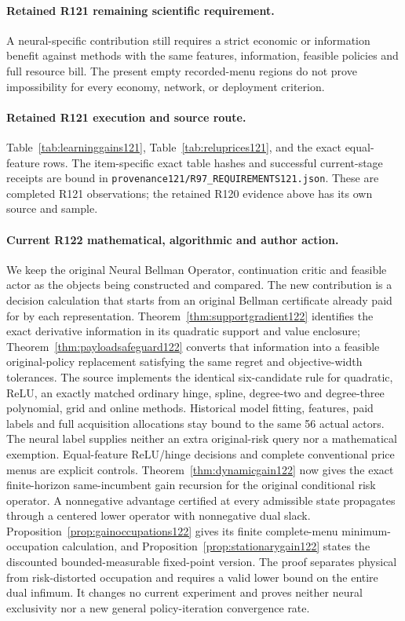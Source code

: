 \paragraph{Retained R121 remaining scientific requirement.}
A neural-specific contribution still requires a strict economic or information benefit against methods with the same features, information, feasible policies and full resource bill. The present empty recorded-menu regions do not prove impossibility for every economy, network, or deployment criterion.

\paragraph{Retained R121 execution and source route.}
Table~\ref{tab:learninggains121}, Table~\ref{tab:reluprices121}, and the exact equal-feature rows.
The item-specific exact table hashes and successful current-stage receipts are bound in \nolinkurl{provenance121/R97_REQUIREMENTS121.json}. These are completed R121 observations; the retained R120 evidence above has its own source and sample.
\paragraph{Current R122 mathematical, algorithmic and author action.}
We keep the original Neural Bellman Operator, continuation critic and feasible actor as the objects being constructed and compared. The new contribution is a decision calculation that starts from an original Bellman certificate already paid for by each representation. Theorem~\ref{thm:supportgradient122} identifies the exact derivative information in its quadratic support and value enclosure; Theorem~\ref{thm:payloadsafeguard122} converts that information into a feasible original-policy replacement satisfying the same regret and objective-width tolerances. The source implements the identical six-candidate rule for quadratic, ReLU, an exactly matched ordinary hinge, spline, degree-two and degree-three polynomial, grid and online methods. Historical model fitting, features, paid labels and full acquisition allocations stay bound to the same 56 actual actors. The neural label supplies neither an extra original-risk query nor a mathematical exemption. Equal-feature ReLU/hinge decisions and complete conventional price menus are explicit controls. Theorem~\ref{thm:dynamicgain122} now gives the exact finite-horizon same-incumbent gain recursion for the original conditional risk operator. A nonnegative advantage certified at every admissible state propagates through a centered lower operator with nonnegative dual slack. Proposition~\ref{prop:gainoccupations122} gives its finite complete-menu minimum-occupation calculation, and Proposition~\ref{prop:stationarygain122} states the discounted bounded-measurable fixed-point version. The proof separates physical from risk-distorted occupation and requires a valid lower bound on the entire dual infimum. It changes no current experiment and proves neither neural exclusivity nor a new general policy-iteration convergence rate.
